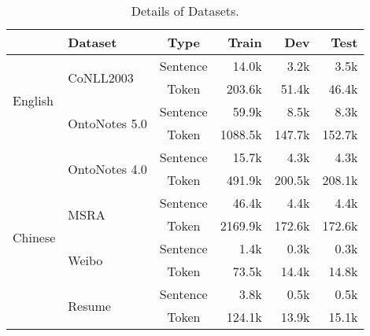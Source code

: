\documentclass[11pt,a4paper]{article}
\begin{document}
\begin{table}[t]\small \setlength{\tabcolsep}{2pt}
  \centering
\begin{threeparttable}
    \caption{Details of Datasets.} \label{tab:datasets_info}
    \begin{tabular}{llcrrr}
    \toprule
                             & Dataset                        & Type     & Train   & Dev    & Test   \\ \midrule
    \multirow{4}{*}{English} & \multirow{2}{*}{CoNLL2003}    & Sentence & 14.0k   & 3.2k   & 3.5k   \\
                             &                                & Token    & 203.6k  & 51.4k  & 46.4k  \\ \cline{2-6}
                             & \multirow{2}{*}{OntoNotes 5.0} & Sentence & 59.9k   & 8.5k   & 8.3k   \\
                             &                                & Token    & 1088.5k & 147.7k & 152.7k \\ \hline
    \multirow{8}{*}{Chinese} & \multirow{2}{*}{OntoNotes 4.0} & Sentence & 15.7k   & 4.3k   & 4.3k   \\
                             &                                & Token    & 491.9k  & 200.5k & 208.1k \\ \cline{2-6}
                             & \multirow{2}{*}{MSRA}          & Sentence & 46.4k   & 4.4k   & 4.4k   \\
                             &                                & Token    & 2169.9k & 172.6k & 172.6k \\ \cline{2-6}
                             & \multirow{2}{*}{Weibo}         & Sentence & 1.4k    & 0.3k   & 0.3k   \\
                             &                                & Token    & 73.5k   & 14.4k  & 14.8k  \\ \cline{2-6}
                             & \multirow{2}{*}{Resume}        & Sentence & 3.8k    & 0.5k   & 0.5k   \\
                             &                                & Token    & 124.1k  & 13.9k  & 15.1k  \\ \bottomrule
    \end{tabular}
\end{threeparttable}
\end{table}
\end{document}
